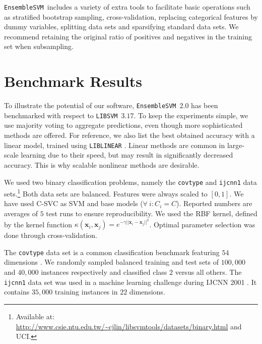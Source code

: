 \documentclass[twoside,11pt]{article}
\newcommand{\esvm}{\texttt{\selectfont EnsembleSVM}}
\newcommand{\libsvm}{\texttt{LIBSVM}}
\begin{document}
\esvm\ includes a variety of extra tools to facilitate basic operations such as
stratified bootstrap sampling, cross-validation, replacing categorical features
by dummy variables, splitting data sets and sparsifying standard data sets. We recommend retaining the original ratio of positives and negatives in the training set when subsampling.

\section{Benchmark Results} \label{bench}
To illustrate the potential of our software, \esvm\ $2.0$ has been benchmarked with respect to \libsvm\
$3.17$. To keep the experiments simple, we use majority voting to aggregate predictions, even though more sophisticated methods are offered. For reference, we also list the best obtained accuracy with a linear model, trained using \texttt{LIBLINEAR} \citep{Fan:2008:LLL:1390681.1442794}. Linear methods are common in large-scale learning due to their speed, but may result in significantly decreased accuracy. This is why scalable nonlinear methods are desirable.

We used two binary classification problems, namely the {\tt covtype} and {\tt ijcnn1} data sets.\footnote{Available
at: \url{http://www.csie.ntu.edu.tw/~cjlin/libsvmtools/datasets/binary.html}
and UCI.} Both data sets are balanced. Features were always scaled to $[0,1]$. We have
used C-SVC as SVM and base models ($\forall\ i: C_i=C$). Reported numbers are averages of $5$ test runs to ensure reproducibility. We used the RBF kernel, defined by the kernel function
$\kappa(\mathbf{x}_i,\mathbf{x}_j)=e^{-\gamma ||\mathbf{x}_i-\mathbf{x}_j||^2}$.
Optimal parameter selection was done through cross-validation.

The \texttt{covtype} data set is a common classification benchmark featuring
$54$ dimensions \citep{Blackard00covtype}. We randomly sampled balanced training
and test sets of $100,000$ and $40,000$ instances respectively and classified class $2$ versus all others. The \texttt{ijcnn1} data set was used in a machine learning challenge during IJCNN 2001 \citep{prokhorov2001ijcnn}. It contains $35,000$ training instances in $22$ dimensions.
\end{document}
